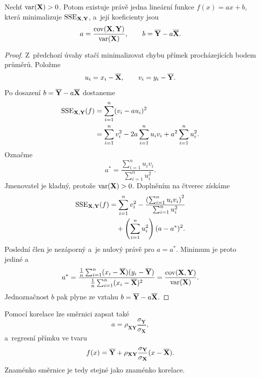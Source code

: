 \begin{proposition}\label{prop:ai-regresni-primka}
    Nechť \(\operatorname{var}(\mathbf{X})>0\). Potom existuje právě jedna lineární funkce
    \(f(x)=ax+b\), která minimalizuje
    \(\operatorname{SSE}_{\mathbf{X},\mathbf{Y}}\), a~její koeficienty jsou
    \[
        a
        =
        \frac{\operatorname{cov}(\mathbf{X},\mathbf{Y})}
        {\operatorname{var}(\mathbf{X})},
        \qquad
        b
        =
        \overline{\mathbf{Y}}
        -
        a\overline{\mathbf{X}}.
    \]
\end{proposition}

\begin{proof}
    Z~předchozí úvahy stačí minimalizovat chybu přímek procházejících bodem průměrů. Položme
    \[
        u_i=x_i-\overline{\mathbf{X}},
        \qquad
        v_i=y_i-\overline{\mathbf{Y}}.
    \]
    Po dosazení \(b=\overline{\mathbf{Y}}-a\overline{\mathbf{X}}\) dostaneme
    \begin{align*}
        \operatorname{SSE}_{\mathbf{X},\mathbf{Y}}(f)
        &=
        \sum_{i=1}^{n}(v_i-au_i)^2\\
        &=
        \sum_{i=1}^{n}v_i^2
        -2a\sum_{i=1}^{n}u_iv_i
        +a^2\sum_{i=1}^{n}u_i^2.
    \end{align*}
    Označme
    \[
        a^\ast
        =
        \frac{\sum_{i=1}^{n}u_iv_i}
        {\sum_{i=1}^{n}u_i^2}.
    \]
    Jmenovatel je kladný, protože \(\operatorname{var}(\mathbf{X})>0\). Doplněním na čtverec získáme
    \begin{align*}
        \operatorname{SSE}_{\mathbf{X},\mathbf{Y}}(f)
        &=
        \sum_{i=1}^{n}v_i^2
        -
        \frac{\left(\sum_{i=1}^{n}u_iv_i\right)^2}
        {\sum_{i=1}^{n}u_i^2}\\
        &\quad+
        \left(\sum_{i=1}^{n}u_i^2\right)
        (a-a^\ast)^2.
    \end{align*}
    Poslední člen je nezáporný a~je nulový právě pro \(a=a^\ast\). Minimum je proto jediné a
    \[
        a^\ast
        =
        \frac{
            \frac1n\sum_{i=1}^{n}
            (x_i-\overline{\mathbf{X}})
            (y_i-\overline{\mathbf{Y}})
        }{
            \frac1n\sum_{i=1}^{n}
            (x_i-\overline{\mathbf{X}})^2
        }
        =
        \frac{\operatorname{cov}(\mathbf{X},\mathbf{Y})}
        {\operatorname{var}(\mathbf{X})}.
    \]
    Jednoznačnost \(b\) pak plyne ze vztahu
    \(b=\overline{\mathbf{Y}}-a\overline{\mathbf{X}}\).
\end{proof}

Pomocí korelace lze směrnici zapsat také
\[
    a
    =
    \rho_{\mathbf{X}\mathbf{Y}}
    \frac{\sigma_{\mathbf{Y}}}{\sigma_{\mathbf{X}}},
\]
a~regresní přímku ve tvaru
\[
    f(x)
    =
    \overline{\mathbf{Y}}
    +
    \rho_{\mathbf{X}\mathbf{Y}}
    \frac{\sigma_{\mathbf{Y}}}{\sigma_{\mathbf{X}}}
    (x-\overline{\mathbf{X}}).
\]
Znaménko směrnice je tedy stejné jako znaménko korelace.

